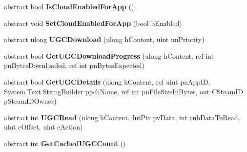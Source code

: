 \begin{DoxyCompactItemize}
\mbox{\label{class_valve_1_1_steamworks_1_1_i_steam_remote_storage_a50c5112e82d3c052c2614524d890a12a}} 
abstract bool {\bfseries Is\+Cloud\+Enabled\+For\+App} ()
\item 
\mbox{\label{class_valve_1_1_steamworks_1_1_i_steam_remote_storage_a02f4208590f0c3ba68a104a684af6cfa}} 
abstract void {\bfseries Set\+Cloud\+Enabled\+For\+App} (bool b\+Enabled)
\item 
\mbox{\label{class_valve_1_1_steamworks_1_1_i_steam_remote_storage_af43ba8d7eaeb954b49d538346be65f94}} 
abstract ulong {\bfseries U\+G\+C\+Download} (ulong h\+Content, uint un\+Priority)
\item 
\mbox{\label{class_valve_1_1_steamworks_1_1_i_steam_remote_storage_a98a4c419b5824559b90376d40bc0c92f}} 
abstract bool {\bfseries Get\+U\+G\+C\+Download\+Progress} (ulong h\+Content, ref int pn\+Bytes\+Downloaded, ref int pn\+Bytes\+Expected)
\item 
\mbox{\label{class_valve_1_1_steamworks_1_1_i_steam_remote_storage_a247888fe6b94dd7cf9ba8ebfa6335ee7}} 
abstract bool {\bfseries Get\+U\+G\+C\+Details} (ulong h\+Content, ref uint pn\+App\+ID, System.\+Text.\+String\+Builder ppch\+Name, ref int pn\+File\+Size\+In\+Bytes, out \hyperlink{struct_valve_1_1_steamworks_1_1_c_steam_i_d}{C\+Steam\+ID} p\+Steam\+I\+D\+Owner)
\item 
\mbox{\label{class_valve_1_1_steamworks_1_1_i_steam_remote_storage_acfa12f29f0c97dfbe78eeaeb420c6fdc}} 
abstract int {\bfseries U\+G\+C\+Read} (ulong h\+Content, Int\+Ptr pv\+Data, int cub\+Data\+To\+Read, uint c\+Offset, uint e\+Action)
\item 
\mbox{\label{class_valve_1_1_steamworks_1_1_i_steam_remote_storage_a4561683d0198c84b8ca7ffb4d35b6799}} 
abstract int {\bfseries Get\+Cached\+U\+G\+C\+Count} ()
\item 
\mbox{\label{class_valve_1_1_steamworks_1_1_i_steam_remote_storage_ade524c6d75e5ca67e9b12c6856a9e9d4}} 

\end{DoxyCompactItemize}
